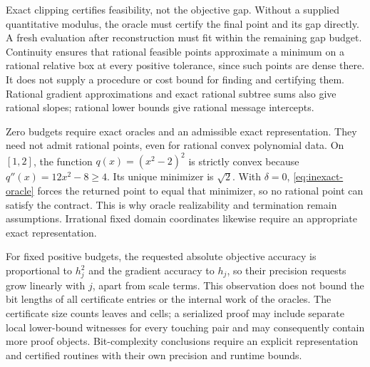 Exact clipping certifies feasibility, not the objective gap.  Without
a supplied quantitative modulus, the oracle must certify the final
point and its gap directly.  A fresh evaluation after reconstruction
must fit within the remaining gap budget.  Continuity ensures that
rational feasible points approximate a minimum on a rational relative
box at every positive tolerance, since such points are dense there.
It does not supply a procedure or cost bound for finding and certifying
them.  Rational gradient approximations and exact rational subtree sums
also give rational slopes; rational lower bounds give rational message
intercepts.

Zero budgets require exact oracles and an admissible exact
representation.  They need not admit rational points, even for rational
convex polynomial data.  On $[1,2]$, the function
$q(x)=(x^2-2)^2$ is strictly convex because $q''(x)=12x^2-8\ge4$.
Its unique minimizer is $\sqrt2$.  With $\delta=0$,
\eqref{eq:inexact-oracle} forces the returned point to equal that
minimizer, so no rational point can satisfy the contract.  This is why
oracle realizability and termination remain assumptions.  Irrational
fixed domain coordinates likewise require an appropriate exact
representation.

For fixed positive budgets, the requested absolute objective accuracy
is proportional to $h_j^2$ and the gradient accuracy to $h_j$, so their
precision requests grow linearly with $j$, apart from scale terms.
This observation does not bound the bit lengths of all certificate
entries or the internal work of the oracles.  The certificate size
counts leaves and cells; a serialized proof may include separate local
lower-bound witnesses for every touching pair and may consequently
contain more proof objects.  Bit-complexity conclusions require an
explicit representation and certified routines with their own precision
and runtime bounds.
